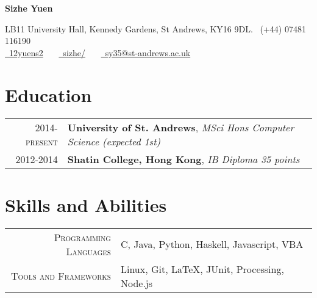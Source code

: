 \documentclass{article}
\newcommand{\n}[0]{\\[\baselineskip]}
\begin{document}
\pagestyle{empty} %


\par{\centering
		{\Large \textbf{Sizhe Yuen}
	}\par}

\begin{center}
LB11 University Hall, Kennedy Gardens, St Andrews, KY16 9DL. \faMobile\ (+44) 07481 116190\\
\href{https://github.com/12yuens2}{\faGithub\ 12yuens2} \ \ \ \href{https://www.linkedin.com/in/sizhe/}{\faLinkedin\ sizhe/} \ \ \ \href{mailto:sy35@st-andrews.ac.uk}{\faEnvelopeO\ sy35@st-andrews.ac.uk}
\end{center}

\section*{Education}
\begin{tabular}{r|p{15cm}}
\textsc{2014-present} & \textbf{University of St. Andrews}, \textit{MSci Hons Computer Science (expected 1st)}
\n

\textsc{2012-2014} & \textbf{Shatin College, Hong Kong}, \textit{IB Diploma 35 points}
\end{tabular}


\section*{Skills and Abilities}
\begin{tabular}{r|p{15cm}}
\textsc{Programming Languages} & C, Java, Python, Haskell, Javascript, VBA\\

\textsc{Tools and Frameworks} & Linux, Git, \LaTeX, JUnit, Processing, Node.js
\end{tabular}
\end{document}

